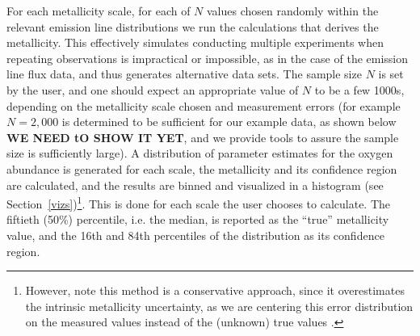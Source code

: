 \documentclass{emulateapj}
\begin{document}
For each metallicity scale, for each of $N$  values chosen randomly within the relevant emission line distributions we run the calculations that derives the metallicity.
This effectively simulates conducting multiple experiments when repeating observations is impractical or impossible, as in the case of the emission line flux data, and thus generates alternative data sets. 
The sample size $N$ is set by the user, and one should expect an appropriate value of $N$ to be a few 1000s, depending on the metallicity scale chosen and measurement errors (for example  $N=2,000$ is determined to be sufficient for our example data, as shown below {\bf WE NEED tO SHOW IT YET}, and we provide tools to assure the sample size is sufficiently large). 
A distribution of parameter estimates for the oxygen abundance is generated for each scale, the metallicity and its confidence region are calculated,
and the results are binned and visualized in a histogram (see Section~\ref{vizs})\footnote{However, note this method is a conservative approach, since it overestimates the intrinsic metallicity uncertainty, as we are centering this error distribution on the measured values instead of the (unknown) true values \citep{andrae10}.
}. This is done for each scale the user chooses to calculate. The fiftieth (50\%) percentile, i.e.  the median, is reported as the ``true'' metallicity value, and the 16th and 84th percentiles of the distribution as its confidence region. %
\end{document}
